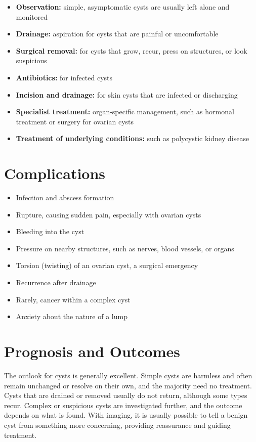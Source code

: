 \begin{itemize}
    \item \textbf{Observation:} simple, asymptomatic cysts are usually left alone and monitored
    \item \textbf{Drainage:} aspiration for cysts that are painful or uncomfortable
    \item \textbf{Surgical removal:} for cysts that grow, recur, press on structures, or look suspicious
    \item \textbf{Antibiotics:} for infected cysts
    \item \textbf{Incision and drainage:} for skin cysts that are infected or discharging
    \item \textbf{Specialist treatment:} organ-specific management, such as hormonal treatment or surgery for ovarian cysts
    \item \textbf{Treatment of underlying conditions:} such as polycystic kidney disease
\end{itemize}

\section*{Complications}
\begin{itemize}
    \item Infection and abscess formation
    \item Rupture, causing sudden pain, especially with ovarian cysts
    \item Bleeding into the cyst
    \item Pressure on nearby structures, such as nerves, blood vessels, or organs
    \item Torsion (twisting) of an ovarian cyst, a surgical emergency
    \item Recurrence after drainage
    \item Rarely, cancer within a complex cyst
    \item Anxiety about the nature of a lump
\end{itemize}

\section*{Prognosis and Outcomes}
The outlook for cysts is generally excellent. Simple cysts are harmless and often remain unchanged or resolve on their own, and the majority need no treatment. Cysts that are drained or removed usually do not return, although some types recur. Complex or suspicious cysts are investigated further, and the outcome depends on what is found. With imaging, it is usually possible to tell a benign cyst from something more concerning, providing reassurance and guiding treatment.

